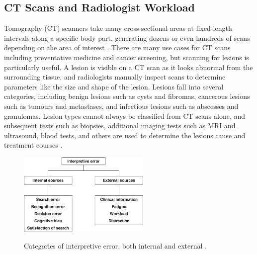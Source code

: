 \subsection{CT Scans and Radiologist Workload}

 Tomography (CT) scanners take many cross-sectional areas at fixed-length intervals along a specific body part, generating dozens or even hundreds of scans depending on the area of interest \cite{PMID:33620865}. There are many use cases for CT scans including preventative medicine and cancer screening, but scanning for lesions is particularly useful. A lesion is visible on a CT scan as it looks abnormal from the surrounding tissue, and radiologists manually inspect scans to determine parameters like the size and shape of the lesion. Lesions fall into several categories, including benign lesions such as cysts and fibromas, cancerous lesions such as tumours and metastases, and infectious lesions such as abscesses and granulomas. Lesion types cannot always be classified from CT scans alone, and subsequent tests such as biopsies, additional imaging tests such as MRI and ultrasound, blood tests, and others are used to determine the lesions cause and treatment courses \cite{oncology}.

\begin{figure}
 \begin{center}
 \includegraphics[width=2.5in]{images/scan_error.jpeg}\\
 \caption{Categories of interpretive error, both internal and external \cite{radiology_error}.}\label{interpret_error}
 \end{center}
\end{figure}

